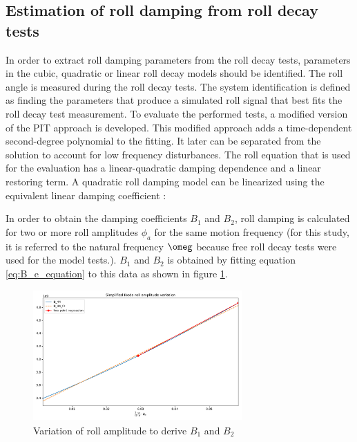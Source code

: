 \subsection{Estimation of roll damping from roll decay tests}
\label{se:experimental_estimation}
In order to extract roll damping parameters from the roll decay tests, parameters in the cubic, quadratic or linear roll decay models should be identified. The roll angle is measured during the roll decay tests. The system identification is defined as finding the parameters that produce a simulated roll signal that best fits the roll decay test measurement. 
To evaluate the performed tests, a modified version of the PIT approach is developed. This modified approach adds a time-dependent second-degree polynomial to the fitting. It later can be separated from the solution to account for low frequency disturbances. The roll equation that is used for the evaluation has a linear-quadratic damping dependence and a linear restoring term. A quadratic roll damping model can be linearized using the equivalent linear damping coefficient \parencite{himeno_prediction_1981}:



In order to obtain the damping coefficients $B_1$ and $B_2$, roll damping is calculated for two or more roll amplitudes $\phi_a$ for the same motion frequency (for this study, it is referred to the natural frequency $\omeg$ because free roll decay tests were used for the model tests.). $B_1$ and $B_2$ is obtained by fitting equation \ref{eq:B_e_equation} to this data as shown in figure \ref{fig:ikeda_B_1_B2}.  

\begin{figure}[H]
    \centering
    \includegraphics[height=5cm, width=8cm]{figures/ikeda_B_1_B_2.pdf}
    \vspace{-0.5cm}
    \caption{Variation of roll amplitude to derive $B_1$ and $B_2$}
    \label{fig:ikeda_B_1_B2}
\end{figure}




